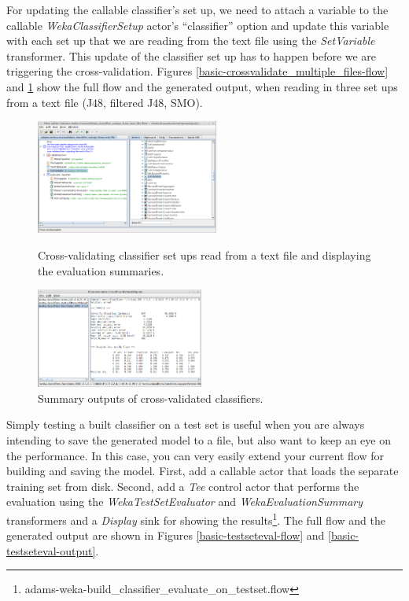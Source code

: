 For updating the callable classifier's set up, we need to attach a variable to the
callable \textit{WekaClassifierSetup} actor's ``classifier'' option and update this
variable with each set up that we are reading from the text file using the
\textit{SetVariable} transformer. This update of the classifier set up has to
happen before we are triggering the cross-validation. Figures
\ref{basic-crossvalidate_multiple_files-flow} and
\ref{basic-crossvalidate_multiple_files-output} show the full flow and the
generated output, when reading in three set ups from a text file (J48,
filtered J48, SMO).

\begin{figure}[ht]
  \begin{minipage}[t]{0.5\linewidth}
    \centering
    \includegraphics[width=6.0cm]{images/basic-crossvalidate_multiple_files-flow.png}
    \caption{Cross-validating classifier set ups read from a text file and
    displaying the evaluation summaries.}
    \label{basic-crossvalidate_multiple_files-flow}
  \end{minipage}
  \hspace{0.5cm}
  \begin{minipage}[t]{0.5\linewidth}
    \centering
    \includegraphics[width=5.5cm]{images/basic-crossvalidate_multiple_files-output.png}
    \caption{Summary outputs of cross-validated classifiers.}
    \label{basic-crossvalidate_multiple_files-output}
  \end{minipage}
\end{figure}

Simply testing a built classifier on a test set is useful when you are always
intending to save the generated model to a file, but also want to keep an eye on
the performance. In this case, you can very easily extend your current flow for
building and saving the model. First, add a callable actor that loads the separate
training set from disk. Second, add a \textit{Tee} control actor that performs
the evaluation using the \textit{WekaTestSetEvaluator} and
\textit{WekaEvaluationSummary} transformers and a \textit{Display} sink for
showing the
results\footnote{adams-weka-build\_classifier\_evaluate\_on\_testset.flow}. The
full flow and the generated output are shown in Figures
\ref{basic-testseteval-flow} and \ref{basic-testseteval-output}.

